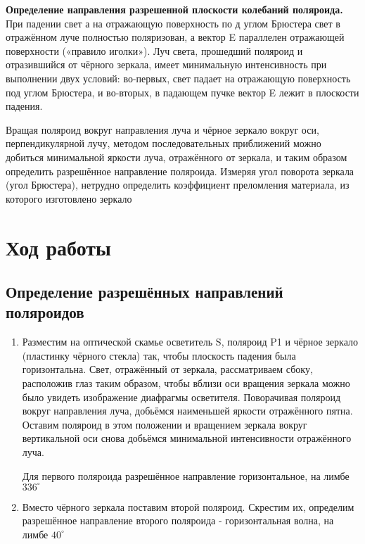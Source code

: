 \documentclass[a4paper]{article}
\begin{document}
\textbf{Определение направления разрешенной плоскости колебаний поляроида.} При падении свет
а на отражающую поверхность по
д углом Брюстера
свет в отражённом луче полностью поляризован,
а вектор
E параллелен
отражающей поверхности («правило иголки»). Луч света, прошедший поляроид и отразившийся от чёрного зеркала, имеет минимальную интенсивность при выполнении двух условий: во-первых, свет падает на отражающую поверхность под углом Брюстера, и во-вторых, в падающем пучке вектор
E лежит в плоскости падения. \par
Вращая поляроид вокруг направления луча
и чёрное зеркало вокруг оси, перпендикулярной лучу, методом последовательных приближений
можно добиться минимальной яркости луча, отражённого от зеркала, и таким образом определить разрешённое направление поляроида. Измеряя угол поворота зеркала (угол Брюстера), нетрудно определить коэффициент преломления материала, из которого изготовлено зеркало \par


\section{Ход работы}
\subsection{Определение разрешённых направлений поляроидов}
\begin{enumerate}
    \item Разместим на оптической скамье осветитель
S, поляроид P1 и чёрное зеркало (пластинку чёрного стекла) так, чтобы плоскость падения была горизонтальна. Свет, отражённый от зеркала, рассматриваем сбоку, расположив глаз таким образом, чтобы вблизи оси вращения зеркала можно было увидеть изображение диафрагмы осветителя.
Поворачивая поляроид вокруг направления луча, добьёмся наименьшей яркости отражённого пятна. Оставим поляроид в этом положении
и вращением зеркала вокруг вертикальной оси снова добьёмся минимальной интенсивности отражённого луча.
\par Для первого поляроида разрешённое направление горизонтальное, на лимбе $336^{\circ}$
\item Вместо чёрного зеркала поставим второй поляроид. Скрестим их, определим разрешённое направление второго поляроида - горизонтальная волна, на лимбе $40^{\circ}$
\end{enumerate}
\end{document}
